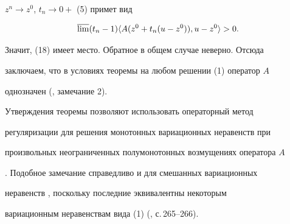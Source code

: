 $z^n\to z^0$, $t_n\to 0+$ (5) примет вид 


$$ 


\varlimsup(t_n-1)\la A(z^0+t_n(u-z^0)),u-z^0\ra>0. 


$$ 


Значит, (18) имеет место. Обратное в общем случае неверно. Отсюда 


заключаем, что в условиях теоремы на любом решении (1) оператор $A$ 


однозначен (\cite{8}, замечание 2). 


 


Утверждения теоремы позволяют использовать операторный метод 


регуляризации для решения монотонных вариационных неравенств при 


произвольных неограниченных полумонотонных возмущениях оператора $A$ 


\cite{13}. Подобное замечание справедливо и для смешанных вариационных 


неравенств \cite{14}, поскольку последние эквивалентны некоторым 


вариационным неравенствам вида (1) (\cite{4}, с.\,265--266). 


 


 


